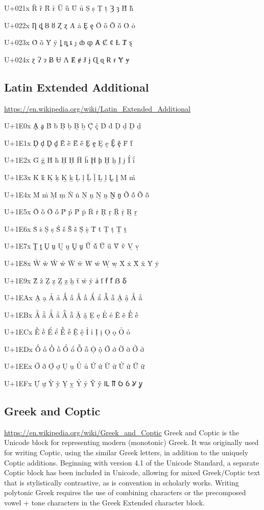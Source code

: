 U+021x 	Ȑ 	ȑ 	Ȓ 	ȓ 	Ȕ 	ȕ 	Ȗ 	ȗ 	Ș 	ș 	Ț 	ț 	Ȝ 	ȝ 	Ȟ 	ȟ

U+022x 	Ƞ 	ȡ 	Ȣ 	ȣ 	Ȥ 	ȥ 	Ȧ 	ȧ 	Ȩ 	ȩ 	Ȫ 	ȫ 	Ȭ 	ȭ 	Ȯ 	ȯ

U+023x 	Ȱ 	ȱ 	Ȳ 	ȳ 	ȴ 	ȵ 	ȶ 	ȷ 	ȸ 	ȹ 	Ⱥ 	Ȼ 	ȼ 	Ƚ 	Ⱦ 	ȿ

U+024x 	ɀ 	Ɂ 	ɂ 	Ƀ 	Ʉ 	Ʌ 	Ɇ 	ɇ 	Ɉ 	ɉ 	Ɋ 	ɋ 	Ɍ 	ɍ 	Ɏ 	ɏ

\subsection{Latin Extended Additional}
\url{https://en.wikipedia.org/wiki/Latin_Extended_Additional}

U+1E0x 	Ḁ 	ḁ 	Ḃ 	ḃ 	Ḅ 	ḅ 	Ḇ 	ḇ 	Ḉ 	ḉ 	Ḋ 	ḋ 	Ḍ 	ḍ 	Ḏ 	ḏ

U+1E1x 	Ḑ 	ḑ 	Ḓ 	ḓ 	Ḕ 	ḕ 	Ḗ 	ḗ 	Ḙ 	ḙ 	Ḛ 	ḛ 	Ḝ 	ḝ 	Ḟ 	ḟ

U+1E2x 	Ḡ 	ḡ 	Ḣ 	ḣ 	Ḥ 	Ḥ 	Ḧ 	ḧ 	Ḩ 	ḩ 	Ḫ 	ḫ 	Ḭ 	ḭ 	Ḯ 	ḯ

U+1E3x 	Ḱ 	ḱ 	Ḳ 	ḳ 	Ḵ 	ḵ 	Ḷ 	ḷ 	Ḹ 	ḹ 	Ḻ 	ḻ 	Ḽ 	ḽ 	Ḿ 	ḿ

U+1E4x 	Ṁ 	ṁ 	Ṃ 	ṃ 	Ṅ 	ṅ 	Ṇ 	ṇ 	Ṉ 	ṉ 	Ṋ 	ṋ 	Ṍ 	ṍ 	Ṏ 	ṏ

U+1E5x 	Ṑ 	ṑ 	Ṓ 	ṓ 	Ṕ 	ṕ 	Ṗ 	ṗ 	Ṙ 	ṙ 	Ṛ 	ṛ 	Ṝ 	ṝ 	Ṟ 	ṟ

U+1E6x 	Ṡ 	ṡ 	Ṣ 	ṣ 	Ṥ 	ṥ 	Ṧ 	ṧ 	Ṩ 	ṩ 	Ṫ 	ṫ 	Ṭ 	ṭ 	Ṯ 	ṯ

U+1E7x 	Ṱ 	ṱ 	Ṳ 	ṳ 	Ṵ 	ṵ 	Ṷ 	ṷ 	Ṹ 	ṹ 	Ṻ 	ṻ 	Ṽ 	ṽ 	Ṿ 	ṿ

U+1E8x 	Ẁ 	ẁ 	Ẃ 	ẃ 	Ẅ 	ẅ 	Ẇ 	ẇ 	Ẉ 	ẉ 	Ẋ 	ẋ 	Ẍ 	ẍ 	Ẏ 	ẏ

U+1E9x 	Ẑ 	ẑ 	Ẓ 	ẓ 	Ẕ 	ẕ 	ẖ 	ẗ 	ẘ 	ẙ 	ẚ 	ẛ 	ẜ 	ẝ 	ẞ 	ẟ

U+1EAx 	Ạ 	ạ 	Ả 	ả 	Ấ 	ấ 	Ầ 	ầ 	Ẩ 	ẩ 	Ẫ 	ẫ 	Ậ 	ậ 	Ắ 	ắ

U+1EBx 	Ằ 	ằ 	Ẳ 	ẳ 	Ẵ 	ẵ 	Ặ 	ặ 	Ẹ 	ẹ 	Ẻ 	ẻ 	Ẽ 	ẽ 	Ế 	ế

U+1ECx 	Ề 	ề 	Ể 	ể 	Ễ 	ễ 	Ệ 	ệ 	Ỉ 	ỉ 	Ị 	ị 	Ọ 	ọ 	Ỏ 	ỏ

U+1EDx 	Ố 	ố 	Ồ 	ồ 	Ổ 	ổ 	Ỗ 	ỗ 	Ộ 	ộ 	Ớ 	ớ 	Ờ 	ờ 	Ở 	ở

U+1EEx 	Ỡ 	ỡ 	Ợ 	ợ 	Ụ 	ụ 	Ủ 	ủ 	Ứ 	ứ 	Ừ 	ừ 	Ử 	ử 	Ữ 	ữ

U+1EFx 	Ự 	ự 	Ỳ 	ỳ 	Ỵ 	ỵ 	Ỷ 	ỷ 	Ỹ 	ỹ 	Ỻ 	ỻ 	Ỽ 	ỽ 	Ỿ 	ỿ

\subsection{Greek and Coptic}
\url{https://en.wikipedia.org/wiki/Greek_and_Coptic}
Greek and Coptic is the Unicode block for representing modern (monotonic) Greek. It was originally used for writing Coptic, using the similar Greek letters, in addition to the uniquely Coptic additions. Beginning with version 4.1 of the Unicode Standard, a separate Coptic block has been included in Unicode, allowing for mixed Greek/Coptic text that is stylistically contrastive, as is convention in scholarly works. Writing polytonic Greek requires the use of combining characters or the precomposed vowel + tone characters in the Greek Extended character block.

